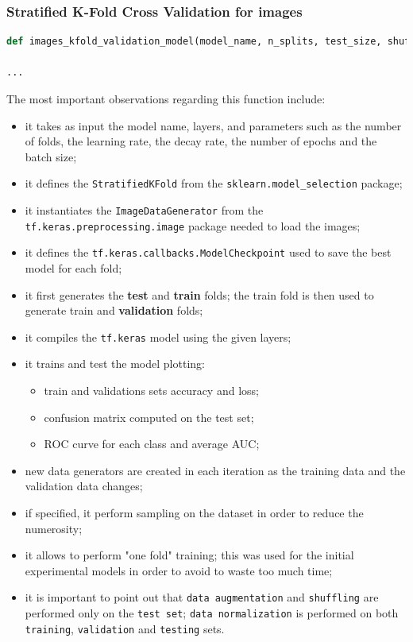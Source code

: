 \documentclass[11pt,a4paper]{article}
\begin{document}
\subsubsection{Stratified K-Fold Cross Validation for images}
\begin{lstlisting}[language=Python,frame=single,caption={Definition of the function used to perform stratified K-Fold cross validation with images data.},captionpos=b]
def images_kfold_validation_model(model_name, n_splits, test_size, shuffle, model, learning_rate, decay, target_size, epochs, batch_size, one_fold=True, resample_data=0, augment=False):

...
\end{lstlisting}
The most important observations regarding this function include:
\begin{itemize}
    \item it takes as input the model name, layers, and parameters such as the number of folds, the learning rate, the decay rate, the number of epochs and the batch size;
    \item it defines the \texttt{StratifiedKFold} from the \texttt{sklearn.model\_selection} package;
    \item it instantiates the \texttt{ImageDataGenerator} from the \texttt{tf.keras.preprocessing.image} package needed to load the images;
    \item it defines the \texttt{tf.keras.callbacks.ModelCheckpoint} used to save the best model for each fold;
    \item it first generates the \textbf{test} and \textbf{train} folds; the train fold is then used to generate train and \textbf{validation} folds;
    \item it compiles the \texttt{tf.keras} model using the given layers;
    \item it trains and test the model plotting:
    \begin{itemize}
        \item train and validations sets accuracy and loss;
        \item confusion matrix computed on the test set;
        \item ROC curve for each class and average AUC;
    \end{itemize}
    \item new data generators are created in each iteration as the training data and the validation data changes;
    \item if specified, it perform sampling on the dataset in order to reduce the numerosity;
    \item it allows to perform "one fold" training; this was used for the initial experimental models in order to avoid to waste too much time;
    \item it is important to point out that \texttt{data augmentation} and \texttt{shuffling} are performed only on the \texttt{test set}; \texttt{data normalization} is performed on both \texttt{training}, \texttt{validation} and \texttt{testing} sets.
\end{itemize}
\end{document}
